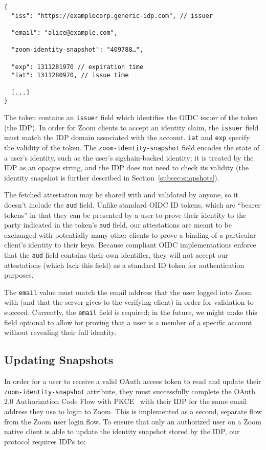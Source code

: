 \begin{Verbatim}
{
  "iss": "https://examplecorp.generic-idp.com", // issuer

  "email": "alice@example.com",

  "zoom-identity-snapshot": "409788…",

  "exp": 1311281970 // expiration time
  "iat": 1311280970, // issue time

  [...]
}
\end{Verbatim}

The token contains an \texttt{issuer} field which identifies the OIDC issuer of the token (the IDP). In
order for Zoom clients to accept an identity claim, the \texttt{issuer} field must match
the IDP domain associated with the account.
\texttt{iat} and \texttt{exp} specify the validity of the token. The
\texttt{zoom-identity-snapshot} field encodes the state of a user’s identity,
such as the user's sigchain-backed identity; it is treated by the IDP as
an opaque string, and the IDP does not need to check its validity (the identity
snapshot is further described in Section~\ref{subsec:snapshots}).  

The fetched attestation may be shared with and validated by anyone, so it
doesn't include the \texttt{aud} field. Unlike standard OIDC ID tokens, which
are ``bearer tokens'' in that they can be presented by a user to prove their
identity to the party indicated in the token's \texttt{aud} field, our
attestations are meant to be exchanged with potentially many other clients to
prove a binding of a particular client's identity to their keys. Because
compliant OIDC implementations enforce that the \texttt{aud} field contains
their own identifier, they will not accept our attestations (which lack this
field) as a standard ID token for authentication purposes.

The \texttt{email} value must match the email address that the user logged into
Zoom with (and that the server gives to the verifying client) in order for validation to succeed.  Currently, the
\texttt{email} field is required; in the future, we might make this field
optional to allow for proving that a user is a member of a specific account
without revealing their full identity.

\subsection{Updating Snapshots}\label{subsec:generateattestation}
In order for a user to receive a valid OAuth access token to read and update their
\texttt{zoom-identity-snapshot} attribute, they must successfully complete the
OAuth 2.0 Authorization Code Flow with PKCE~\cite{rfc7636} with their IDP for the same email address they
use to login to Zoom. This is implemented as a second, separate flow from the
Zoom user login flow. To ensure that only an authorized user on a Zoom native
client is able to update the identity snapshot stored by the IDP, our protocol
requires IDPs to:

